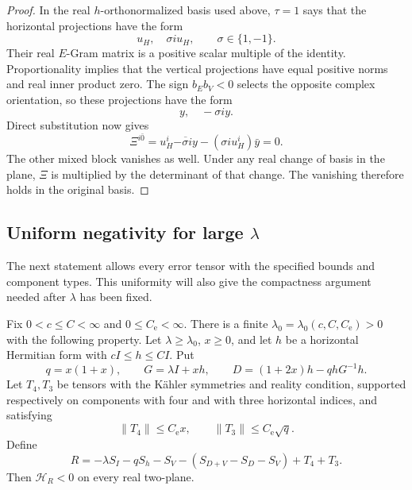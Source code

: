 \begin{proof}
In the real \(h\)-orthonormalized basis used above, \(\tau=1\) says
that the horizontal projections have the form
\[
 u_H,\quad \sigma i u_H,\qquad \sigma\in\{1,-1\}.
\]
Their real \(E\)-Gram matrix is a positive scalar multiple of the
identity.  Proportionality implies that the vertical projections have
equal positive norms and real inner product zero.
The sign \(b_Eb_V<0\) selects the opposite complex orientation, so these
projections have the form
\[
 y,\quad-\sigma i y.
\]
Direct substitution now gives
\[
 \Xi^{i\bar0}
 =u_H^i\overline{-\sigma i y}-(\sigma i u_H^i)\bar y=0.
\]
The other mixed block vanishes as well.
Under any real change of basis in the plane, \(\Xi\) is multiplied by
the determinant of that change.  The vanishing therefore holds in the
original basis.
\end{proof}

\subsection{Uniform negativity for large \texorpdfstring{\(\lambda\)}{lambda}}

The next statement allows every error tensor with the specified bounds
and component types.  This uniformity will also give the compactness
argument needed after \(\lambda\) has been fixed.

\begin{lemma}\label{pinch:positivity}
Fix \(0<c\le C<\infty\) and \(0\le C_{\mathrm e}<\infty\).
There is a finite \(\lambda_0=\lambda_0(c,C,C_{\mathrm e})>0\) with the following
property.
Let \(\lambda\ge\lambda_0\), \(x\ge0\), and let \(h\) be a horizontal
Hermitian form with \(cI\le h\le CI\).  Put
\[
 q=x(1+x),\qquad G=\lambda I+xh,\qquad
 D=(1+2x)h-qhG^{-1}h.
\]
Let \(T_4,T_3\) be tensors with the Kähler symmetries and reality
condition, supported respectively on components with four and with
three horizontal indices, and satisfying
\[
 \|T_4\|\le C_{\mathrm e}x,\qquad
 \|T_3\|\le C_{\mathrm e}\sqrt q.
\]
Define
\[
 R=-\lambda S_I-qS_h-S_V-(S_{D+V}-S_D-S_V)+T_4+T_3.
\]
Then \(\mathcal H_R<0\) on every real two-plane.
\end{lemma}

